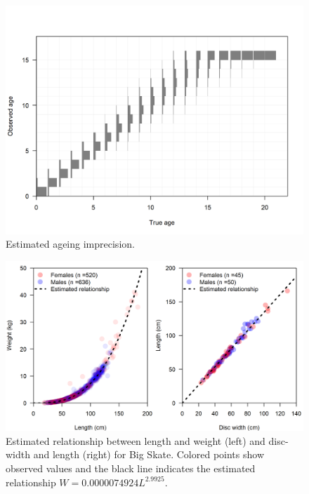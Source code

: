 \documentclass[12pt,]{article}
\begin{document}
\begin{figure}
\centering
\includegraphics{r4ss/plots_mod1/numbers10_ageerror_matrix_1.png}
\caption{Estimated ageing imprecision.\label{fig:ageing_imprecision}}
\end{figure}

\begin{figure}
\centering
\includegraphics{Figures/Big Skate bio relationships.png}
\caption{Estimated relationship between length and weight (left) and
disc-width and length (right) for Big Skate. Colored points show
observed values and the black line indicates the estimated relationship
\(W = 0.0000074924L^{2.9925}\).\label{fig:weight-length}}
\end{figure}
\end{document}
